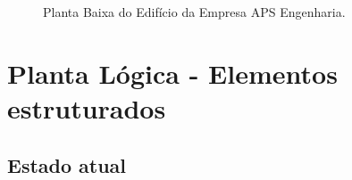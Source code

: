 \documentclass[	DIV=calc,%
							paper=a4,%
							fontsize=12pt,%
							onecolumn]{scrartcl}	 					%
\begin{document}
\begin{figure}
	\noindent{}
	\caption{Planta Baixa do Edifício da Empresa APS Engenharia.}
	\label{plantabaixa}
\end{figure}

\clearpage
{}
\recalctypearea


\section{Planta Lógica - Elementos estruturados}

\subsection{Estado atual}


\clearpage
{}
\recalctypearea
\end{document}
